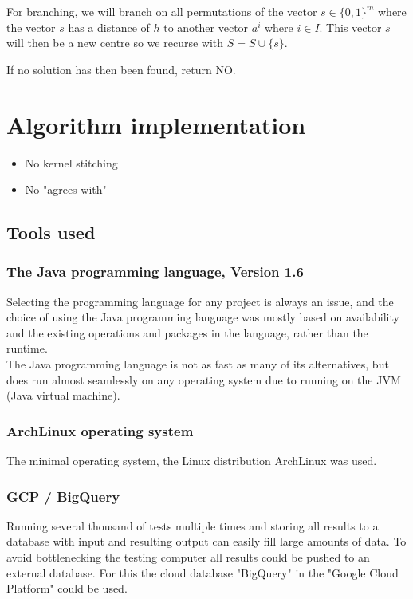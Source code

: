 \documentclass[a4paper]{article}
\begin{document}
For branching, we will branch on all permutations of the vector $s \in \{0,1\}^m$ where the vector $s$ has a
distance of $h$ to another vector $a^i$ where $i \in I$. This vector $s$ will then be a new centre so we recurse
with $S = S \cup \{s\}$.

If no solution has then been found, return NO.



%
%
\newpage

\section{Algorithm implementation}
\begin{itemize}
    \item No kernel stitching
    \item No "agrees with"
\end{itemize}
\subsection{Tools used}
\subsubsection{The Java programming language, Version 1.6}
Selecting the programming language for any project is always an issue, and the choice of using
the Java programming language was mostly based on availability and the existing operations
and packages in the language, rather than the runtime.
\\
The Java programming language is not as fast as many of its alternatives, but does run almost
seamlessly on any operating system due to running on the JVM (Java virtual machine).

\subsubsection{ArchLinux operating system}
The minimal operating system, the Linux distribution ArchLinux was used.

\subsubsection{GCP / BigQuery}
Running several thousand of tests multiple times and storing all results to a database with
input and resulting output can easily fill large amounts of data. To avoid bottlenecking the
testing computer all results could be pushed to an external database. For this the cloud database
"BigQuery" in the "Google Cloud Platform" could be used.
\end{document}
